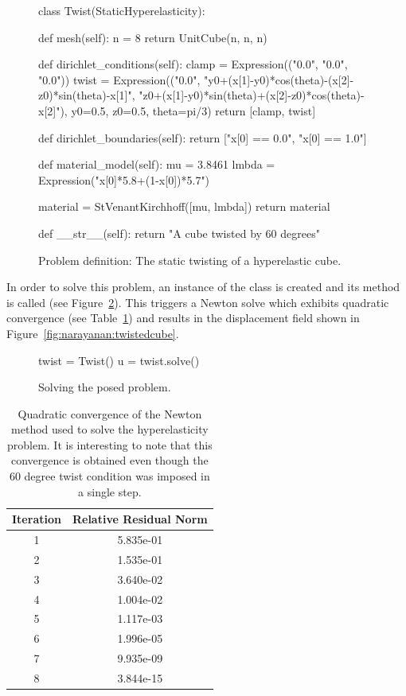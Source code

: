 \begin{figure}
\bwfig
\begin{python}
class Twist(StaticHyperelasticity):

    def mesh(self):
        n = 8
        return UnitCube(n, n, n)

    def dirichlet_conditions(self):
        clamp = Expression(("0.0", "0.0", "0.0"))
        twist = Expression(("0.0",
        "y0+(x[1]-y0)*cos(theta)-(x[2]-z0)*sin(theta)-x[1]",
        "z0+(x[1]-y0)*sin(theta)+(x[2]-z0)*cos(theta)-x[2]"),
        y0=0.5, z0=0.5, theta=pi/3)
        return [clamp, twist]

    def dirichlet_boundaries(self):
        return ["x[0] == 0.0", "x[0] == 1.0"]

    def material_model(self):
        mu    = 3.8461
        lmbda = Expression("x[0]*5.8+(1-x[0])*5.7")

        material = StVenantKirchhoff([mu, lmbda])
        return material

    def __str__(self):
        return "A cube twisted by 60 degrees"
\end{python}
\caption{Problem definition: The static twisting of a hyperelastic
  cube.}
\label{code:narayanan:statictwist}
\end{figure}

In order to solve this problem, an instance of the  class
is created and its  method is called (see
Figure~\ref{code:narayanan:solveproblem}). This triggers a Newton
solve which exhibits quadratic convergence (see
Table~\ref{tab:narayanan:residualnorms}) and results in the
displacement field shown in
Figure~\ref{fig:narayanan:twistedcube}.

\begin{figure}
\bwfig
\begin{python}
twist = Twist()
u = twist.solve()
\end{python}
\caption{Solving the posed problem.}
\label{code:narayanan:solveproblem}
\end{figure}

\begin{table}
  \centering
    \begin{tabular}{cc}
      \toprule
      Iteration & Relative Residual Norm \\
      \midrule
      1 & 5.835e-01\\
      2 & 1.535e-01\\
      3 & 3.640e-02\\
      4 & 1.004e-02\\
      5 & 1.117e-03\\
      6 & 1.996e-05\\
      7 & 9.935e-09\\
      8 & 3.844e-15\\
      \bottomrule
    \end{tabular}
    \caption{Quadratic convergence of the Newton method used to solve
      the hyperelasticity problem. It is interesting to note that this
      convergence is obtained even though the 60 degree twist
      condition was imposed in a single step.}
    \label{tab:narayanan:residualnorms}
\end{table}


